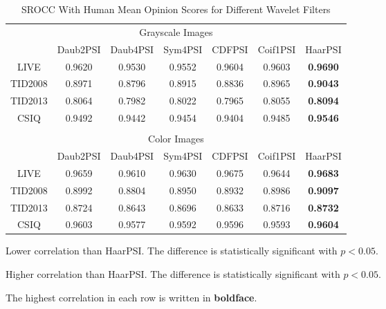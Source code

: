 \documentclass[11pt,a4paper]{article}
\begin{document}
\setlength{\tabcolsep}{2mm}
\begin{table}[!htb]
\centering
\caption{SROCC With Human Mean Opinion Scores for Different Wavelet Filters}
  \label{tab:otherwavelets}
\begin{threeparttable}
\begin{small}
\begin{tabular}{*{7}{c}}
\toprule[0.5mm]
\multicolumn{7}{c}{Grayscale Images}\\[0.1cm]
  & Daub2PSI & Daub4PSI & Sym4PSI & CDFPSI & Coif1PSI & HaarPSI\\
 LIVE & \cellcolor{green!25}0.9620 & \cellcolor{green!25}0.9530 & \cellcolor{green!25}0.9552 & \cellcolor{green!25}0.9604 & \cellcolor{green!25}0.9603 & \textbf{0.9690}\\
 TID2008 & 0.8971 & \cellcolor{green!25}0.8796 & 0.8915 & \cellcolor{green!25}0.8836 & 0.8965 & \textbf{0.9043}\\
 TID2013 & 0.8064 & 0.7982 & 0.8022 & 0.7965 & 0.8055 & \textbf{0.8094}\\
 CSIQ & 0.9492 & \cellcolor{green!25}0.9442 & 0.9454 & \cellcolor{green!25}0.9404 & 0.9485 & \textbf{0.9546}\\
\\
\multicolumn{7}{c}{Color Images}\\[0.1cm]
  & Daub2PSI & Daub4PSI & Sym4PSI & CDFPSI & Coif1PSI & HaarPSI\\
 LIVE & 0.9659 & \cellcolor{green!25}0.9610 & 0.9630 & 0.9675 & 0.9644 & \textbf{0.9683}\\
 TID2008 & 0.8992 & \cellcolor{green!25}0.8804 & \cellcolor{green!25}0.8950 & \cellcolor{green!25}0.8932 & 0.8986 & \textbf{0.9097}\\
 TID2013 & 0.8724 & 0.8643 & 0.8696 & 0.8633 & 0.8716 & \textbf{0.8732}\\
 CSIQ & 0.9603 & 0.9577 & 0.9592 & 0.9596 & 0.9593 & \textbf{0.9604}\\\midrule[0.5mm]
\end{tabular}
\end{small}
\begin{scriptsize}
\begin{tablenotes}
\item \colorbox{green!25}{Lower correlation than HaarPSI. The difference is statistically significant with $p < 0.05$.}
\item \colorbox{red!25}{Higher correlation than HaarPSI. The difference is statistically significant with $p < 0.05$.}
\item The highest correlation in each row is written in \textbf{boldface}.
\end{tablenotes}
\end{scriptsize}
\end{threeparttable}

\end{table}
\end{document}
